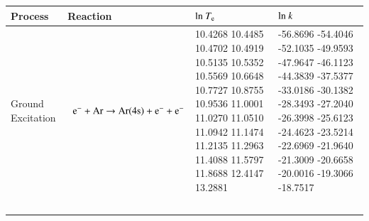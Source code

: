 \documentclass{warpdoc}
\renewcommand{\fontsizetable}{\footnotesize\scalefont{0.9}}
\begin{document}
\begin{table}[!ht]
  \center\fontsizetable
  
  \begin{threeparttable}
    \label{tab:ei_splines_Ar}
    \fontsizetable
 
    \begin{tabular*}{\textwidth}{@{}l@{\extracolsep{\fill}}lll@{}}
    
    \toprule
Process & Reaction ~ & ${\rm ln}~T_{\rm e}$ & ${\rm ln}~k$ \\
        \midrule
        

Ground Excitation & ~{$\rm e^- + Ar \rightarrow Ar(4s) + e^- + e^-$  } &   \begin{minipage}[t]{0.28\textwidth}\raggedright  
      10.4268
      10.4485
      10.4702
      10.4919
      10.5135
      10.5352
      10.5569
      10.6648
      10.7727
      10.8755
      10.9536
      11.0001
      11.0270
      11.0510
      11.0942
      11.1474
      11.2135
      11.2963
      11.4088
      11.5797
      11.8688
      12.4147
      13.2881
 \end{minipage}  & \begin{minipage}[t]{0.28\textwidth}\raggedright 
      -56.8696
      -54.4046
      -52.1035
      -49.9593
      -47.9647
      -46.1123
      -44.3839
      -37.5377
      -33.0186
      -30.1382
      -28.3493
      -27.2040
      -26.3998
      -25.6123
      -24.4623
      -23.5214
      -22.6969
      -21.9640
      -21.3009
      -20.6658
      -20.0016
      -19.3066
      -18.7517
\end{minipage} \\         
~\\


\end{tabular*}
\end{threeparttable}
\end{table}
\end{document}

